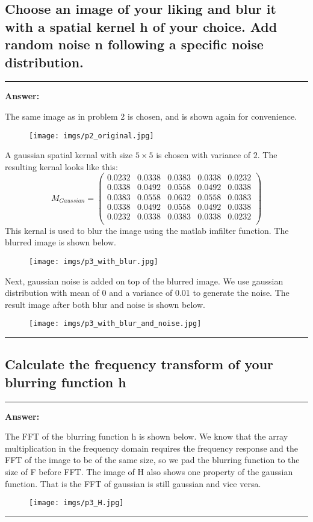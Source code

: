 \documentclass[conference]{styles/acmsiggraph}
\newenvironment{answer}{}{}
\begin{document}
\subsection{Choose an image of your liking and blur it with a spatial kernel h of your choice. Add random
noise n following a specific noise distribution.}
\begin{answer}
	\rule{\textwidth}{0.4pt}
	\textbf{Answer:}	
	
	The same image as in problem 2 is chosen, and is shown again for convenience. 
	\begin{figure}[H]
		\centering
		\texttt{[image: imgs/p2\_original.jpg]}
		\end{figure}	
	A gaussian spatial kernal with size $5\times5$ is chosen with variance of $2$. The resulting kernal looks like this:
	$$M_{Gaussian} = \begin{pmatrix}
		0.0232  &  0.0338  &  0.0383 &   0.0338  &  0.0232\\
    0.0338 &   0.0492 &   0.0558 &   0.0492 &   0.0338\\
    0.0383 &   0.0558 &   0.0632  &  0.0558  &  0.0383\\
    0.0338  &  0.0492  &  0.0558  &  0.0492 &   0.0338\\
    0.0232  &  0.0338  &  0.0383  &  0.0338  &  0.0232\\
		\end{pmatrix}$$
	This kernal is used to blur the image using the matlab imfilter function. The blurred image is shown below.
	\begin{figure}[H]
	\centering
	\texttt{[image: imgs/p3\_with\_blur.jpg]}
	\end{figure}	
	Next, gaussian noise is added on top of the blurred image. We use  gaussian distribution with mean of 0 and a variance of 0.01 to generate the noise. The result image after both blur and noise is shown below.
	\begin{figure}[H]
	\centering
	\texttt{[image: imgs/p3\_with\_blur\_and\_noise.jpg]}
	\end{figure}	

	\rule{\textwidth}{0.4pt}
\end{answer}

\subsection{Calculate the frequency transform of your blurring function h}
\begin{answer}
	\rule{\textwidth}{0.4pt}
	\textbf{Answer:}	
	
	The FFT of the blurring function h is shown below. We know that the array multiplication in the frequency domain requires the frequency response and the FFT of the image to be of the same size, so we pad the blurring function to the size of F before FFT. The image of H also shows one property of the gaussian function. That is the FFT of gaussian is still gaussian and vice versa. 
	\begin{figure}[H]
		\centering
		\texttt{[image: imgs/p3\_H.jpg]}
		\end{figure}	
	
	\rule{\textwidth}{0.4pt}
\end{answer}
\end{document}
